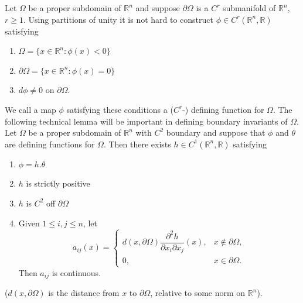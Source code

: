 Let $\Omega$ be a proper subdomain of $\mathbb R^n$ and suppose $\partial\Omega$ is a $C^r$ submanifold of $\mathbb R^n$, $r\geq1$. Using partitions of unity it is not hard to construct $\phi\in C^r(\mathbb R^n,\mathbb R)$ satisfying
\begin{enumerate}
\item[A)] $\Omega=\{x\in\mathbb R^n:\phi(x)<0\}$
\item[B)] $\partial\Omega=\{x\in\mathbb R^n:\phi(x)=0\}$
\item[C)] $d\phi\neq0$ on $\partial\Omega$.
\end{enumerate}
We call a map $\phi$ satisfying these conditions a ($C^r$-) defining function for $\Omega$. The following technical lemma will be important in defining boundary invariants of $\Omega$.
 Let $\Omega$ be a proper subdomain of $\mathbb R^n$ with $C^2$ boundary and suppose that $\phi$ and $\theta$ are defining functions for $\Omega$. Then there exists $h\in C^1(\mathbb R^n,\mathbb R)$ satisfying
\begin{enumerate}
\item[a)] $\phi=h.\theta$
\item[b)] $h$ is strictly positive
\item[c)] $h$ is $C^2$ off $\partial\Omega$
\item[d)] Given $1\leq i,j\leq n$, let
\[a_{ij}(x)=\begin{cases}d(x,\partial\Omega)\dfrac{\partial^2h}{\partial x_i\partial x_j}(x),&x\notin\partial\Omega,\\0,&x\in\partial\Omega.\end{cases}\]
Then $a_{ij}$ is continuous.
\end{enumerate}
($d(x,\partial\Omega)$ is the distance from $x$ to $\partial\Omega$, relative to some norm on $\mathbb R^n$).
